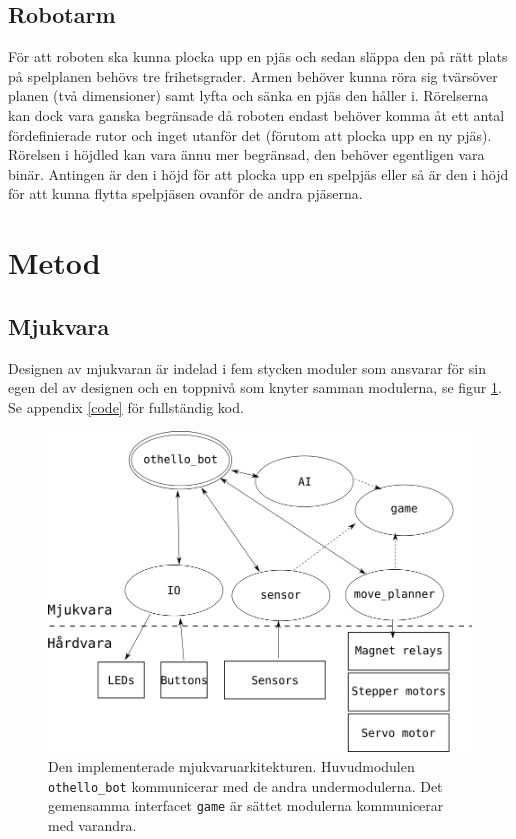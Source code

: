 \documentclass[a4paper]{article}
\begin{document}
\subsection{Robotarm}
För att roboten ska kunna plocka upp en pjäs och sedan släppa den på rätt plats på spelplanen behövs tre frihetsgrader.
Armen behöver kunna röra sig tvärsöver planen (två dimensioner) samt lyfta och sänka en pjäs den håller i.
Rörelserna kan dock vara ganska begränsade då roboten endast behöver komma åt ett antal fördefinierade rutor och inget utanför det (förutom att plocka upp en ny pjäs).
Rörelsen i höjdled kan vara ännu mer begränsad, den behöver egentligen vara binär.
Antingen är den i höjd för att plocka upp en spelpjäs eller så är den i höjd för att kunna flytta spelpjäsen ovanför de andra pjäserna.

\section{Metod}
\subsection{Mjukvara}
Designen av mjukvaran är indelad i fem stycken moduler som ansvarar för sin egen del av designen och en toppnivå som knyter samman modulerna, se figur \ref{system_arch}.
Se appendix \ref{code} för fullständig kod.
\begin{figure}\label{system_arch}
\centering
\includegraphics[scale=0.6]{system_arch}
\caption{Den implementerade mjukvaruarkitekturen. Huvudmodulen \texttt{othello\_bot} kommunicerar med de andra undermodulerna. Det gemensamma interfacet \texttt{game} är sättet modulerna kommunicerar med varandra.}
\end{figure}
\end{document}
